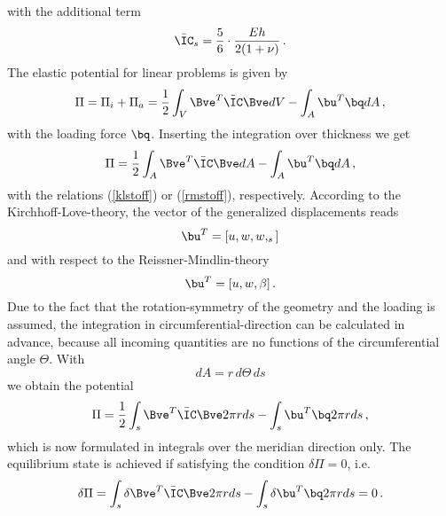 with the additional term
\begin{eqnarray}
\bar{\IC}_s = \frac{5}{6} \cdot \frac{Eh}{2 (1+\nu)}\, .
\end{eqnarray}
The elastic potential for linear problems is given by 
\begin{equation}
\Pi = \Pi_i + \Pi_a = \frac{1}{2} \int_V \Bve^T \tilde\IC \Bve dV 
- \int_A \bu^T
\bq dA \, ,
\label{eq:elpot}
\end{equation}
with the loading force $\bq$. 
Inserting the integration over thickness we get 
\begin{equation}
\Pi = \frac{1}{2} \int_A \Bve^T \bar{\IC} \Bve dA - \int_A \bu^T
\bq dA \, ,
\end{equation}
with the relations (\ref{klstoff}) or (\ref{rmstoff}), respectively. 
According to the Kirchhoff-Love-theory, the vector of 
the generalized displacements reads 
\begin{equation}
\bu^T = [u,w,w,_s]
\end{equation}
and with respect to the Reissner-Mindlin-theory
\begin{equation}
\bu^T = [u,w,\beta]  \, .
\end{equation}
Due to the fact that the rotation-symmetry of the geometry 
and the loading is assumed, the integration in 
circumferential-direction can be calculated in advance, 
because all incoming quantities are no functions of the 
circumferential angle $\Theta$. 
With
\begin{equation}
dA = r \,d \Theta \,ds
\end{equation}
we obtain the potential
\begin{equation}
\Pi = \frac{1}{2} \int_s \Bve^T \bar{\IC} \Bve 2 \pi r ds - \int_s \bu^T
\bq 2 \pi r ds \, ,
\end{equation}
which is now formulated in integrals over the meridian 
direction only. 
The equilibrium state is achieved if satisfying the condition 
$\delta \Pi = 0$, i.e.
\begin{equation}
\delta \Pi = \int_s \delta \Bve^T \bar{\IC} \Bve 2 \pi r ds - 
\int_s \delta \bu^T \bq 2 \pi r ds = 0 \,. 
\end{equation}









